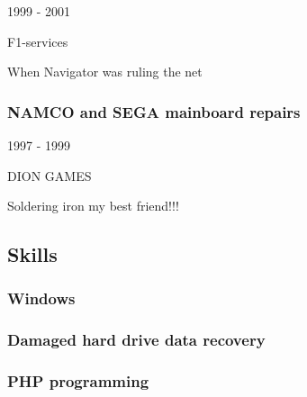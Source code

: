 \documentclass[english,]{article}
\begin{document}
1999 - 2001

F1-services

When Navigator was ruling the net

\hypertarget{namco-and-sega-mainboard-repairs}{%
\subsubsection{NAMCO and SEGA mainboard
repairs}\label{namco-and-sega-mainboard-repairs}}

1997 - 1999

DION GAMES

Soldering iron my best friend!!!

\hypertarget{skills}{%
\subsection{\texorpdfstring{{ \emph{} \emph{} }
Skills}{    Skills}}\label{skills}}

\hypertarget{windows}{%
\subsubsection{Windows}\label{windows}}

\hypertarget{damaged-hard-drive-data-recovery}{%
\subsubsection{Damaged hard drive data
recovery}\label{damaged-hard-drive-data-recovery}}

\hypertarget{php-programming}{%
\subsubsection{PHP programming}\label{php-programming}}
\end{document}
